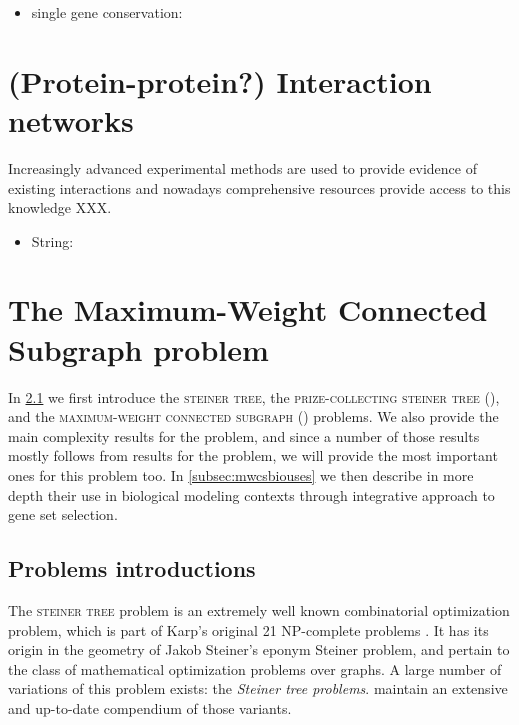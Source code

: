 		\begin{itemize}
			\item single gene conservation: \cite{van2003predicting}
		\end{itemize}


\section{(Protein-protein?) Interaction networks}

	Increasingly advanced experimental methods are used to provide evidence of existing interactions and nowadays comprehensive resources provide access to this knowledge XXX.%

	\begin{itemize}
		\item String: \parencite{szklarczyk2014string}
	\end{itemize}

\section{The Maximum-Weight Connected Subgraph problem}

	In \cref{subsec:mwcsintro} we first introduce the \textsc{steiner tree}, the \textsc{prize-collecting steiner tree} (\pcst{}), and the \textsc{maximum-weight connected subgraph} (\mwcs{}) problems.
	We also provide the main complexity results for the \mwcs{} problem, and since a number of those results mostly follows from results for the \pcst{} problem, we will provide the most important ones for this problem too.
	In \cref{subsec:mwcsbiouses} we then describe in more depth their use in biological modeling contexts through integrative approach to gene set selection.

	\subsection{Problems introductions}
	\label{subsec:mwcsintro}

	The \textsc{steiner tree} problem is an extremely well known combinatorial optimization problem, which is part of Karp's original 21 NP-complete problems \parencite{karp1972reducibility}.
	It has its origin in the geometry of Jakob Steiner's eponym Steiner problem, and pertain to the class of mathematical optimization problems over graphs.
	A large number of variations of this problem exists: the \emph{Steiner tree problems}.
	\Textcite{hauptmann2014compendium} maintain an extensive and up-to-date compendium of those variants.

